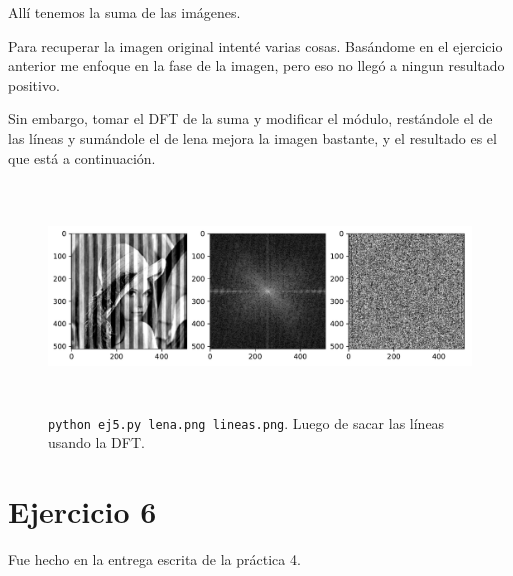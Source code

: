 \documentclass[11pt, spanish]{article}
\begin{document}
Allí tenemos la suma de las imágenes.

Para recuperar la imagen original intenté varias cosas. Basándome en el ejercicio anterior me enfoque en la fase de la
imagen, pero eso no llegó a ningun resultado positivo.

Sin embargo, tomar el DFT de la suma y modificar el módulo, restándole el de las líneas y sumándole el de lena mejora la
imagen bastante, y el resultado es el que está a continuación.

\begin{figure}[H]
\centering
  \includegraphics[height=6cm]{informe-imgs/ej5-res.pdf}
  \caption{\texttt{python ej5.py lena.png lineas.png}. Luego de sacar las líneas usando la DFT.}
\end{figure}



\newpage
\section{Ejercicio 6}
Fue hecho en la entrega escrita de la práctica 4.
\end{document}
